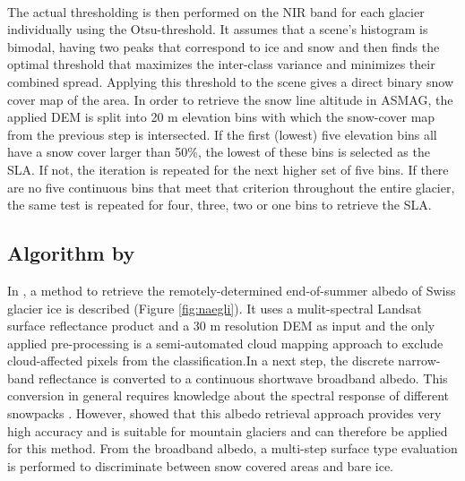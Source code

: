 \documentclass[12pt]{article}
\begin{document}
\\
The actual thresholding is then performed on the NIR band for each glacier individually using the Otsu-threshold. It assumes that a scene’s histogram is bimodal, having two peaks that correspond to ice and snow and then finds the optimal threshold that maximizes the inter-class variance and minimizes their combined spread. Applying this threshold to the scene gives a direct binary snow cover map of the area. In order to retrieve the snow line altitude in ASMAG, the applied DEM is split into 20 m elevation bins with which the snow-cover map from the previous step is intersected. If the first (lowest) five elevation bins all have a snow cover larger than 50\%, the lowest of these bins is selected as the SLA. If not, the iteration is repeated for the next higher set of five bins. If there are no five continuous bins that meet that criterion throughout the entire glacier, the same test is repeated for four, three, two or one bins to retrieve the SLA.


\subsection{Algorithm by \cite{Naegeli2018}}
\label{Nageli}

In \cite{Naegeli2018}, a method to retrieve the remotely-determined end-of-summer albedo of Swiss glacier ice is described (Figure \ref{fig:naegli}). It uses a mulit-spectral Landsat surface reflectance product and a 30 m resolution DEM as input and the only applied pre-processing is a semi-automated cloud mapping approach to exclude cloud-affected pixels from the classification.In a next step, the discrete narrow-band reflectance is converted to a continuous shortwave broadband albedo. This conversion in general requires knowledge about the spectral response of different snowpacks \cite{Bamber2007}. However, \cite{Naegeli2017} showed that this albedo retrieval approach provides very high accuracy and is suitable for mountain glaciers and can therefore be applied for this method. From the broadband albedo, a multi-step surface type evaluation is performed to discriminate between snow covered areas and bare ice. 
\end{document}

